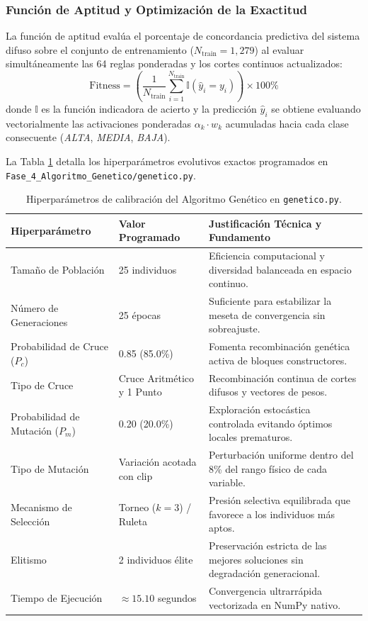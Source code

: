 \documentclass{article}
\begin{document}
\subsubsection{Función de Aptitud y Optimización de la Exactitud}
La función de aptitud evalúa el porcentaje de concordancia predictiva del sistema difuso sobre el conjunto de entrenamiento ($N_{\text{train}} = 1,279$) al evaluar simultáneamente las 64 reglas ponderadas y los cortes continuos actualizados:
\begin{equation}
    \text{Fitness} = \left( \frac{1}{N_{\text{train}}} \sum_{i=1}^{N_{\text{train}}} \mathbb{I}\left( \hat{y}_i = y_i \right) \right) \times 100\%
\end{equation}
donde $\mathbb{I}$ es la función indicadora de acierto y la predicción $\hat{y}_i$ se obtiene evaluando vectorialmente las activaciones ponderadas $\alpha_k \cdot w_k$ acumuladas hacia cada clase consecuente (\textit{ALTA}, \textit{MEDIA}, \textit{BAJA}).

La Tabla \ref{tab:hiperparametros_ga} detalla los hiperparámetros evolutivos exactos programados en \texttt{Fase\_4\_Algoritmo\_Genetico/genetico.py}.

\begin{table}[H]
\centering
\caption{Hiperparámetros de calibración del Algoritmo Genético en \texttt{genetico.py}.}
\label{tab:hiperparametros_ga}
\small
\begin{tabularx}{\textwidth}{p{4.2cm}p{3.6cm}X}
\toprule
\textbf{Hiperparámetro} & \textbf{Valor Programado} & \textbf{Justificación Técnica y Fundamento} \\
\midrule
Tamaño de Población & 25 individuos & Eficiencia computacional y diversidad balanceada en espacio continuo. \\
Número de Generaciones & 25 épocas & Suficiente para estabilizar la meseta de convergencia sin sobreajuste. \\
Probabilidad de Cruce ($P_c$) & 0.85 (85.0\%) & Fomenta recombinación genética activa de bloques constructores. \\
Tipo de Cruce & Cruce Aritmético y 1 Punto & Recombinación continua de cortes difusos y vectores de pesos. \\
Probabilidad de Mutación ($P_m$) & 0.20 (20.0\%) & Exploración estocástica controlada evitando óptimos locales prematuros. \\
Tipo de Mutación & Variación acotada con clip & Perturbación uniforme dentro del 8\% del rango físico de cada variable. \\
Mecanismo de Selección & Torneo ($k=3$) / Ruleta & Presión selectiva equilibrada que favorece a los individuos más aptos. \\
Elitismo & 2 individuos élite & Preservación estricta de las mejores soluciones sin degradación generacional. \\
Tiempo de Ejecución & $\approx 15.10$ segundos & Convergencia ultrarrápida vectorizada en NumPy nativo. \\
\bottomrule
\end{tabularx}
\end{table}
\end{document}
